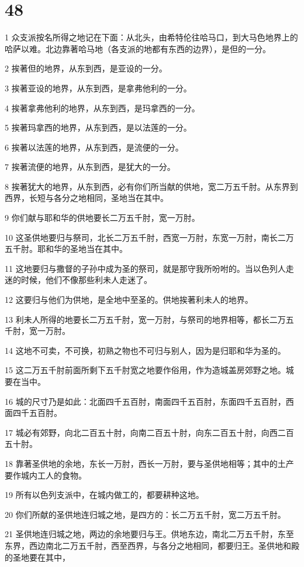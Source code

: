 \chapter{48}

\par 1 众支派按名所得之地记在下面：从北头，由希特伦往哈马口，到大马色地界上的哈萨以难。北边靠著哈马地（各支派的地都有东西的边界），是但的一分。
\par 2 挨著但的地界，从东到西，是亚设的一分。
\par 3 挨著亚设的地界，从东到西，是拿弗他利的一分。
\par 4 挨著拿弗他利的地界，从东到西，是玛拿西的一分。
\par 5 挨著玛拿西的地界，从东到西，是以法莲的一分。
\par 6 挨著以法莲的地界，从东到西，是流便的一分。
\par 7 挨著流便的地界，从东到西，是犹大的一分。
\par 8 挨著犹大的地界，从东到西，必有你们所当献的供地，宽二万五千肘。从东界到西界，长短与各分之地相同，圣地当在其中。
\par 9 你们献与耶和华的供地要长二万五千肘，宽一万肘。
\par 10 这圣供地要归与祭司，北长二万五千肘，西宽一万肘，东宽一万肘，南长二万五千肘。耶和华的圣地当在其中。
\par 11 这地要归与撒督的子孙中成为圣的祭司，就是那守我所吩咐的。当以色列人走迷的时候，他们不像那些利未人走迷了。
\par 12 这要归与他们为供地，是全地中至圣的。供地挨著利未人的地界。
\par 13 利未人所得的地要长二万五千肘，宽一万肘，与祭司的地界相等，都长二万五千肘，宽一万肘。
\par 14 这地不可卖，不可换，初熟之物也不可归与别人，因为是归耶和华为圣的。
\par 15 这二万五千肘前面所剩下五千肘宽之地要作俗用，作为造城盖房郊野之地。城要在当中。
\par 16 城的尺寸乃是如此：北面四千五百肘，南面四千五百肘，东面四千五百肘，西面四千五百肘。
\par 17 城必有郊野，向北二百五十肘，向南二百五十肘，向东二百五十肘，向西二百五十肘。
\par 18 靠著圣供地的余地，东长一万肘，西长一万肘，要与圣供地相等；其中的土产要作城内工人的食物。
\par 19 所有以色列支派中，在城内做工的，都要耕种这地。
\par 20 你们所献的圣供地连归城之地，是四方的：长二万五千肘，宽二万五千肘。
\par 21 圣供地连归城之地，两边的余地要归与王。供地东边，南北二万五千肘，东至东界，西边南北二万五千肘，西至西界，与各分之地相同，都要归王。圣供地和殿的圣地要在其中，

